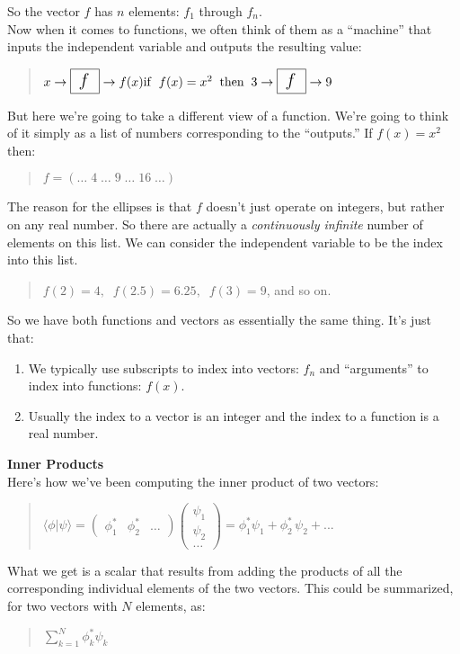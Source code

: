 \documentclass{article}
\def\braket#1#2{\langle#1|#2\rangle}
\newcommand{\cviii}[3]
    {\left(\begin{array}{c}#1\\#2\\#3\end{array}\right)}
\newcommand{\rviii}[3]
    {\left(\begin{array}{ccc}#1&#2&#3\end{array}\right)}
\newcommand{\head}[1]{ \vspace{12pt} {\bf #1} \vspace{-12pt}\\ }
\def\p{ \vspace{10pt}\\ }
\begin{document}
So the vector $f$ has $n$ elements: $f_1$ through $f_n$.
\p
Now when it comes to functions, we often think of them as a ``machine''
that inputs the independent variable and outputs the resulting
value:

\begin{quote}
$
x \rightarrow {\fbox{ \Large{$f$} }} \rightarrow f(x)
\p
\mathrm{if} \;\; f(x) = x^2 \;\; \mathrm{then}\;\;
3 \rightarrow {\fbox{ \Large{$f$} }} \rightarrow 9 
$
\end{quote}

But here we're going to take a different view of a function. We're going to
think of it simply as a list of numbers corresponding to the ``outputs.''
If $f(x) = x^2$ then:

\begin{quote}
$f = \left( \ldots \;4\; \ldots \;9\; \dots \;16\; \ldots \right)$
\end{quote}

The reason for the ellipses is that $f$ doesn't just operate on integers, but
rather on any real number. So there are actually a {\it continuously infinite}
number of elements on this list. We can consider the independent variable to
be the index into this list. 

\begin{quote}
$f(2)=4, \;\; f(2.5)=6.25, \;\; f(3)=9$, and so on.
\end{quote}
\pagebreak
So we have both functions and vectors as essentially the same thing. It's
just that:
\begin{enumerate}
\item We typically use subscripts to index into vectors: $f_n$ and
``arguments'' to index into functions: $f(x)$.
\item Usually the index to a vector is an integer and the index to a function
is a real number.
\end{enumerate}

\head{Inner Products}

Here's how we've been computing the inner product of two vectors:
\begin{quote}
$
\braket{\phi}{\psi} 
= \rviii{\phi^*_1}{\phi^*_2}{\ldots} \cviii{\psi_1}{\psi_2}{\ldots}
= \phi^*_1\psi_1 + \phi^*_2 \, \psi_2 + ...
$
\end{quote}
What we get is a scalar that results from adding the products of all
the corresponding individual elements of the two vectors. This could be
summarized, for two vectors with $N$ elements, as:

\begin{quote}
$\displaystyle\sum^N_{k=1} \phi^*_k \psi_k$
\end{quote}
\end{document}
